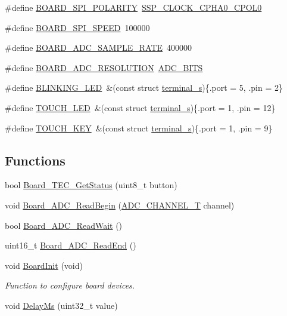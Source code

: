 \begin{DoxyCompactItemize}
\item 
\#define \hyperlink{group__hal_gabbae270b8b4d3d6246035c4993d18382}{B\+O\+A\+R\+D\+\_\+\+S\+P\+I\+\_\+\+P\+O\+L\+A\+R\+I\+TY}~\hyperlink{group___s_s_p__18_x_x__43_x_x_ggab423240914ad746147aeb31f483e9553aa5340f759c78820f18de9290b9c061c9}{S\+S\+P\+\_\+\+C\+L\+O\+C\+K\+\_\+\+C\+P\+H\+A0\+\_\+\+C\+P\+O\+L0}
\item 
\#define \hyperlink{group__hal_gae6bd5c3023dea708cefcf1be2d5b4441}{B\+O\+A\+R\+D\+\_\+\+S\+P\+I\+\_\+\+S\+P\+E\+ED}~100000
\item 
\#define \hyperlink{group__hal_ga5d9a9a6c17d8e964672936721bc21dc2}{B\+O\+A\+R\+D\+\_\+\+A\+D\+C\+\_\+\+S\+A\+M\+P\+L\+E\+\_\+\+R\+A\+TE}~400000
\item 
\#define \hyperlink{group__hal_ga5b673df98c7ace8c0428c12e0de5ec64}{B\+O\+A\+R\+D\+\_\+\+A\+D\+C\+\_\+\+R\+E\+S\+O\+L\+U\+T\+I\+ON}~\hyperlink{group___a_d_c__18_x_x__43_x_x_gga6da04ef4d158a6d61909481ed94df1a3a8cb6bb0d2b9d30206b3892df2e1776c2}{A\+D\+C\+\_\+B\+I\+TS}
\item 
\#define \hyperlink{group__hal_ga7df8b8faeffb332d3a85829727f6e3f3}{B\+L\+I\+N\+K\+I\+N\+G\+\_\+\+L\+ED}~\&(const struct \hyperlink{structterminal__s}{terminal\+\_\+s})\{.port = 5, .pin = 2\}
\item 
\#define \hyperlink{group__hal_ga11baf524276151957e8037eaed95b162}{T\+O\+U\+C\+H\+\_\+\+L\+ED}~\&(const struct \hyperlink{structterminal__s}{terminal\+\_\+s})\{.port = 1, .pin = 12\}
\item 
\#define \hyperlink{group__hal_ga622f361da595a38bbb742894f48f7339}{T\+O\+U\+C\+H\+\_\+\+K\+EY}~\&(const struct \hyperlink{structterminal__s}{terminal\+\_\+s})\{.port = 1, .pin = 9\}
\end{DoxyCompactItemize}
\subsection*{Functions}
\begin{DoxyCompactItemize}
\item 
bool \hyperlink{group__hal_ga872de86244ed2e3b86c2bf26b9c64733}{Board\+\_\+\+T\+E\+C\+\_\+\+Get\+Status} (uint8\+\_\+t button)
\item 
void \hyperlink{group__hal_ga8cc33a8b61c622ac85ae3740a121100b}{Board\+\_\+\+A\+D\+C\+\_\+\+Read\+Begin} (\hyperlink{group___a_d_c__18_x_x__43_x_x_ga30ee7058bc7cc1daff718b29b42bed4e}{A\+D\+C\+\_\+\+C\+H\+A\+N\+N\+E\+L\+\_\+T} channel)
\item 
bool \hyperlink{group__hal_ga0e575f815466079643b007d0279f28bf}{Board\+\_\+\+A\+D\+C\+\_\+\+Read\+Wait} ()
\item 
uint16\+\_\+t \hyperlink{group__hal_ga51147ea5d2ae45e50453fbdd4e2c590d}{Board\+\_\+\+A\+D\+C\+\_\+\+Read\+End} ()
\item 
void \hyperlink{group__hal_gad24575a3bcf2c2433e7720830d813e64}{Board\+Init} (void)
\begin{DoxyCompactList}\small\item\em Function to configure board devices. \end{DoxyCompactList}\item 
void \hyperlink{group__hal_gace922d758774792e0573b7c568fe2a3f}{Delay\+Ms} (uint32\+\_\+t value)
\end{DoxyCompactItemize}
